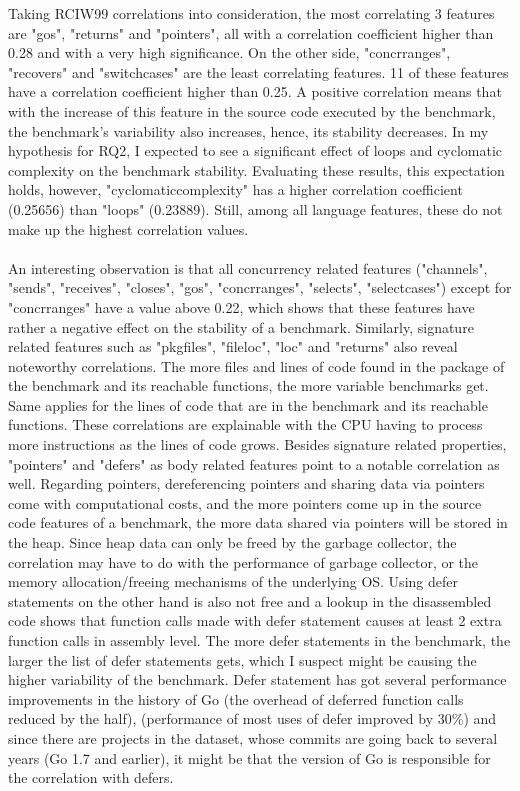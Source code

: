 \documentclass{seal_thesis}
\begin{document}
\noindent Taking RCIW99 correlations into consideration, the most correlating 3 features are "gos", "returns" and "pointers", all with a correlation coefficient higher than 0.28 and with a very high significance. On the other side, "concrranges", "recovers" and "switchcases" are the least correlating features. 11 of these features have a correlation coefficient higher than 0.25. A positive correlation means that with the increase of this feature in the source code executed by the benchmark, the benchmark's variability also increases, hence, its stability decreases. In my hypothesis for RQ2, I expected to see a significant effect of loops and cyclomatic complexity on the benchmark stability. Evaluating these results, this expectation holds, however, "cyclomaticcomplexity" has a higher correlation coefficient (0.25656) than "loops" (0.23889). Still, among all language features, these do not make up the highest correlation values.\\
\\
An interesting observation is that all concurrency related features ("channels", "sends", "receives", "closes", "gos", "concrranges", "selects", "selectcases") except for "concrranges" have a value above 0.22, which shows that these features have rather a negative effect on the stability of a benchmark. Similarly, signature related features such as "pkgfiles", "fileloc", "loc" and "returns" also reveal noteworthy correlations. The more files and lines of code found in the package of the benchmark and its reachable functions, the more variable benchmarks get. Same applies for the lines of code that are in the benchmark and its reachable functions. These correlations are explainable with the CPU having to process more instructions as the lines of code grows. Besides signature related properties, "pointers" and "defers" as body related features point to a notable correlation as well. Regarding pointers, dereferencing pointers and sharing data via pointers come with computational costs, and the more pointers come up in the source code features of a benchmark, the more data shared via pointers will be stored in the heap. Since heap data can only be freed by the garbage collector, the correlation may have to do with the performance of garbage collector, or the memory allocation/freeing mechanisms of the underlying OS. Using defer statements on the other hand is also not free and a lookup in the disassembled code shows that function calls made with defer statement causes at least 2 extra function calls in assembly level. The more defer statements in the benchmark, the larger the list of defer statements gets, which I suspect might be causing the higher variability of the benchmark. Defer statement has got several performance improvements in the history of Go \cite{go18} (the overhead of deferred function calls reduced by the half), \cite{go113} (performance of most uses of defer improved by 30\%) and since there are projects in the dataset, whose commits are going back to several years (Go 1.7 and earlier), it might be that the version of Go is responsible for the correlation with defers.
\end{document}
